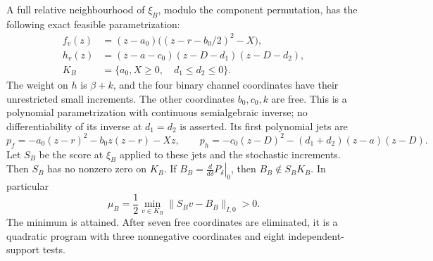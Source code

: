 \begin{proposition}\label{prop:geometric-cone}
A full relative neighbourhood of $\xi_B$, modulo the component
permutation, has the following exact feasible parametrization:
\begin{align}
 f_v(z)&=(z-a_0)\bigl((z-r-b_0/2)^2-X\bigr),\nonumber\\
 h_v(z)&=(z-a-c_0)(z-D-d_1)(z-D-d_2),\label{eq:geometric-chart}\\
 K_B&=\{a_0,X\ge0,\quad d_1\le d_2\le0\}.\nonumber
\end{align}
The weight on $h$ is $\beta+k$, and the four binary channel coordinates
have their unrestricted small increments. The other coordinates
$b_0,c_0,k$ are free. This is a polynomial parametrization with continuous
semialgebraic inverse; no differentiability of its inverse at
$d_1=d_2$ is asserted. Its first polynomial jets are
\begin{equation}\label{eq:geometric-jets}
 p_f=-a_0(z-r)^2-b_0z(z-r)-Xz,\qquad
 p_h=-c_0(z-D)^2-(d_1+d_2)(z-a)(z-D).
\end{equation}
Let $S_B$ be the score at $\xi_B$ applied to these jets and the stochastic
increments. Then $S_B$ has no nonzero zero on $K_B$. If
$B_B=\left.\frac{d}{d\delta}P_\delta\right|_0$, then
$B_B\notin S_BK_B$. In particular
\begin{equation}\label{eq:mu-B}
 \mu_B=\frac12\min_{v\in K_B}\|S_Bv-B_B\|_{I,0}>0.
\end{equation}
The minimum is attained. After seven free coordinates are eliminated,
it is a quadratic program with three nonnegative coordinates and eight
independent-support tests.
\end{proposition}
